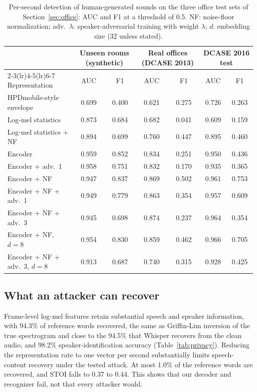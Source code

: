 \documentclass[11pt]{article}
\begin{document}
\begin{table}[t]
\centering\small
\caption{Per-second detection of human-generated sounds on the three office test sets of Section~\ref{sec:office}: AUC and F1 at a threshold of 0.5. NF: noise-floor normalization; adv.\ $\lambda$: speaker-adversarial training with weight $\lambda$; $d$: embedding size (32 unless stated).}
\label{tab:utility}
\begin{tabular}{@{}lcccccc@{}}
\toprule
& \multicolumn{2}{c}{Unseen rooms (synthetic)} & \multicolumn{2}{c}{Real offices (DCASE 2013)} & \multicolumn{2}{c}{DCASE 2016 test} \\
\cmidrule(lr){2-3}\cmidrule(lr){4-5}\cmidrule(lr){6-7}
Representation & AUC & F1 & AUC & F1 & AUC & F1 \\
\midrule
HPDmobile-style envelope & 0.699 & 0.400 & 0.621 & 0.275 & 0.726 & 0.263 \\
Log-mel statistics & 0.873 & 0.684 & 0.682 & 0.041 & 0.609 & 0.159 \\
Log-mel statistics + NF & 0.894 & 0.699 & 0.760 & 0.447 & 0.895 & 0.460 \\
Encoder & 0.959 & 0.852 & 0.834 & 0.251 & 0.950 & 0.436 \\
Encoder + adv.\ 1 & 0.958 & 0.751 & 0.832 & 0.170 & 0.935 & 0.365 \\
Encoder + NF & 0.947 & 0.837 & 0.869 & 0.502 & 0.961 & 0.753 \\
Encoder + NF + adv.\ 1 & 0.949 & 0.779 & 0.863 & 0.354 & 0.957 & 0.609 \\
Encoder + NF + adv.\ 3 & 0.945 & 0.698 & 0.874 & 0.237 & 0.964 & 0.354 \\
Encoder + NF, $d=8$ & 0.954 & 0.830 & 0.859 & 0.462 & 0.966 & 0.705 \\
Encoder + NF + adv.\ 3, $d=8$ & 0.913 & 0.687 & 0.740 & 0.315 & 0.928 & 0.425 \\
\bottomrule
\end{tabular}
\end{table}

\subsection{What an attacker can recover}
\label{sec:privacy}
Frame-level log-mel features retain substantial speech and speaker information, with 94.3\% of reference words recovered, the same as Griffin-Lim inversion of the true spectrogram and close to the 94.5\% that Whisper recovers from the clean audio, and 98.2\% speaker-identification accuracy (Table~\ref{tab:privacy}). Reducing the representation rate to one vector per second substantially limits speech-content recovery under the tested attack. At most 1.0\% of the reference words are recovered, and STOI falls to 0.37 to 0.44. This shows that our decoder and recognizer fail, not that every attacker would.
\end{document}
